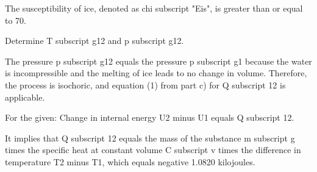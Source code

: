 The susceptibility of ice, denoted as chi subscript "Eis", is greater than or equal to 70.

Determine T subscript g12 and p subscript g12.

The pressure p subscript g12 equals the pressure p subscript g1 because the water is incompressible and the melting of ice leads to no change in volume. Therefore, the process is isochoric, and equation (1) from part c) for Q subscript 12 is applicable.

For the given:
Change in internal energy U2 minus U1 equals Q subscript 12.

It implies that Q subscript 12 equals the mass of the substance m subscript g times the specific heat at constant volume C subscript v times the difference in temperature T2 minus T1, which equals negative 1.0820 kilojoules.